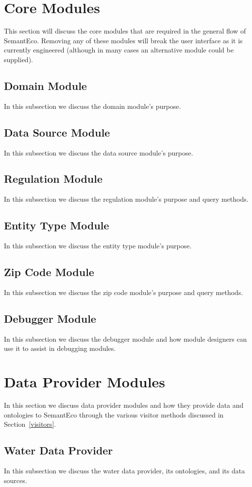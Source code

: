 \documentclass[letterpaper]{report}
\begin{document}
\section{Core Modules}
This section will discuss the core modules that are required in the general flow of SemantEco. Removing any of these modules will break the user interface as it is currently engineered (although in many cases an alternative module could be supplied).
\subsection{Domain Module}
In this subsection we discuss the domain module's purpose.
\subsection{Data Source Module}
In this subsection we discuss the data source module's purpose.
\subsection{Regulation Module}
In this subsection we discuss the regulation module's purpose and query methods.
\subsection{Entity Type Module}
In this subsection we discuss the entity type module's purpose.
\subsection{Zip Code Module}
In this subsection we discuss the zip code module's purpose and query methods.
\subsection{Debugger Module}
In this subsection we discuss the debugger module and how module designers can use it to assist in debugging modules.
\section{Data Provider Modules}
In this section we discuss data provider modules and how they provide data and ontologies to SemantEco through the various visitor methods discussed in Section~\ref{visitors}.
\subsection{Water Data Provider}
In this subsection we discuss the water data provider, its ontologies, and its data sources.
\end{document}
